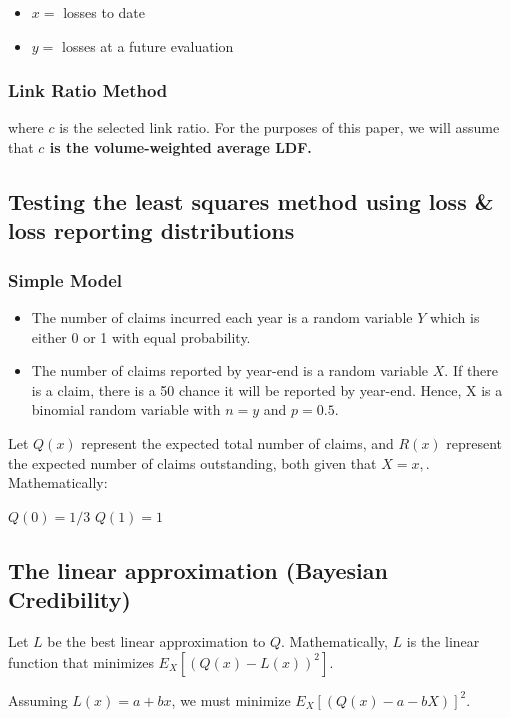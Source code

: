 \documentclass{article}
\begin{document}
\begin{itemize}
  \item $x =$ losses to date
  \item $y =$ losses at a future evaluation
\end{itemize}

\subsubsection{Link Ratio Method}
where $c$ is the selected link ratio. For the purposes of this paper, we will
assume that \textbf{$c$ is the volume-weighted average LDF.}

\subsection{Testing the least squares method using loss \& loss
reporting distributions}

\subsubsection{Simple Model}

\begin{itemize}
  \item The number of claims incurred each year is a random variable
    $Y$ which is either 0 or 1 with equal probability.
  \item The number of claims reported by year-end is a random
    variable $X$. If there is a claim, there is a 50 chance it will
    be reported by year-end. Hence, X is a binomial random variable
    with $n = y$ and $p = 0.5$.

\end{itemize}

Let $Q(x)$ represent the expected total number of claims, and $R(x)$
represent the expected number of claims outstanding, both given that
$X=x    ,$. Mathematically:

$Q(0) = 1/3$
$Q(1) = 1$

\subsection{The linear approximation (Bayesian Credibility)}

Let $L$ be the best linear approximation to $Q$. Mathematically, $L$
is the linear function that minimizes $E_{X}[(Q(x) - L(x))^2]$.

Assuming $L(x) = a + bx$, we must minimize $E_{X}[(Q(x) - a - bX)]^2$.
\end{document}
